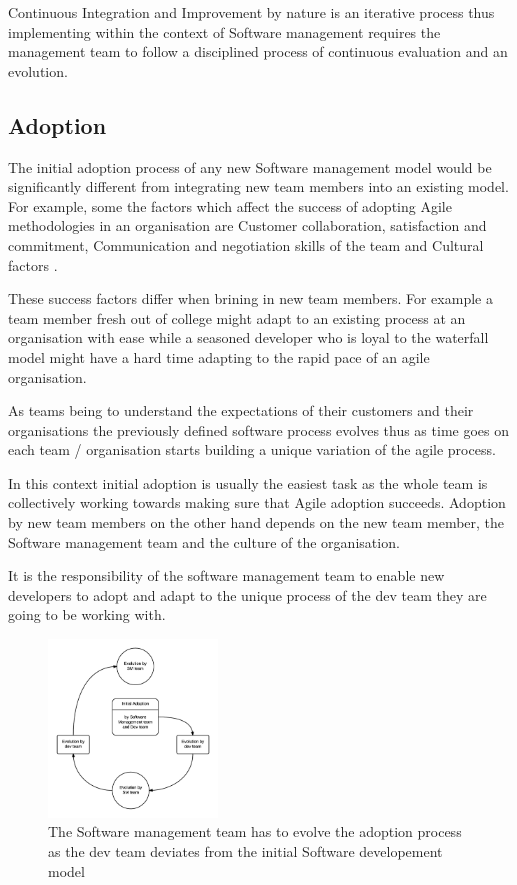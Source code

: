 \documentclass[12pt,conference]{IEEEtran}
\begin{document}
Continuous Integration and Improvement by nature is an iterative process thus implementing within the context of Software management requires the management team to follow a disciplined process of continuous evaluation and an evolution.

\subsection*{Adoption}
The initial adoption process of any new Software management model would be significantly different from integrating new team members into an existing model. For example, some the factors which affect the success of adopting Agile methodologies in an organisation are 
Customer collaboration, satisfaction and commitment, Communication and negotiation skills of the team and Cultural factors \cite{misra_identifying_2009}.

These success factors differ when brining in new team members. For example a team member fresh out of college might adapt to an existing process at an organisation with ease while a seasoned developer who is loyal to the waterfall model might have a hard time adapting to the rapid pace of an agile organisation. 

As teams being to understand the expectations of their customers and their organisations the previously defined software process evolves thus as time goes on each team / organisation starts building a unique variation of the agile process.

In this context initial adoption is usually the easiest task as the whole team is collectively working towards making sure that Agile adoption succeeds. Adoption by new team members on the other hand depends on the new team member, the Software management team and the culture of the organisation.

It is the responsibility of the software management team to enable new developers to adopt and adapt to the unique process of the dev team they are going to be working with.

\begin{figure}[t]
\centering
\includegraphics[width=0.4\textwidth]{sm_dev_team_process_evolution.png}
\caption{The Software management team has to evolve the adoption process as the dev team deviates from the initial Software developement model}
\end{figure}
\end{document}
